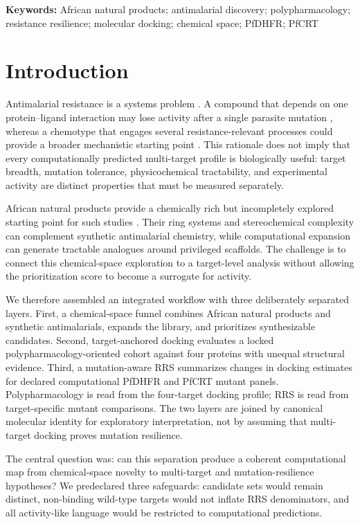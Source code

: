 \documentclass[journal=jcisd8,manuscript=article]{achemso}
\begin{document}
\noindent\textbf{Keywords:} African natural products; antimalarial discovery; polypharmacology; resistance resilience; molecular docking; chemical space; PfDHFR; PfCRT

\section{Introduction}
Antimalarial resistance is a systems problem \cite{WHO2024MalariaReport,Ariey2014,Ashley2018}. A compound that depends on one protein--ligand interaction may lose activity after a single parasite mutation \cite{Fidock2000}, whereas a chemotype that engages several resistance-relevant processes could provide a broader mechanistic starting point \cite{Wells2015,SiqueiraNeto2023}. This rationale does not imply that every computationally predicted multi-target profile is biologically useful: target breadth, mutation tolerance, physicochemical tractability, and experimental activity are distinct properties that must be measured separately.

African natural products provide a chemically rich but incompletely explored starting point for such studies \cite{Newman2007,NtieKang2018,Simoben2023,Cheuka2020}. Their ring systems and stereochemical complexity can complement synthetic antimalarial chemistry, while computational expansion can generate tractable analogues around privileged scaffolds. The challenge is to connect this chemical-space exploration to a target-level analysis without allowing the prioritization score to become a surrogate for activity.

We therefore assembled an integrated workflow with three deliberately separated layers. First, a chemical-space funnel combines African natural products and synthetic antimalarials, expands the library, and prioritizes synthesizable candidates. Second, target-anchored docking evaluates a locked polypharmacology-oriented cohort against four proteins with unequal structural evidence. Third, a mutation-aware RRS summarizes changes in docking estimates for declared computational PfDHFR and PfCRT mutant panels. Polypharmacology is read from the four-target docking profile; RRS is read from target-specific mutant comparisons. The two layers are joined by canonical molecular identity for exploratory interpretation, not by assuming that multi-target docking proves mutation resilience.

The central question was: can this separation produce a coherent computational map from chemical-space novelty to multi-target and mutation-resilience hypotheses? We predeclared three safeguards: candidate sets would remain distinct, non-binding wild-type targets would not inflate RRS denominators, and all activity-like language would be restricted to computational predictions.
\end{document}
